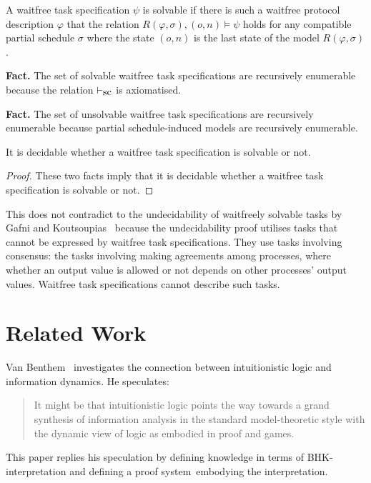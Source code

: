   \begin{definition}
   A waitfree task specification $\psi$ is solvable if there is such a
   waitfree protocol description $\varphi$ that the relation
   $R(\varphi,\sigma), (o,n)\models\psi$ holds for any compatible partial
   schedule $\sigma$ where the state $(o,n)$ is the last state of the
   model $R(\varphi,\sigma)$.
  \end{definition}

  \noindent \textbf{Fact.} The set of solvable waitfree task specifications are
  recursively enumerable because the relation $\vdash_{\mbox{\rm sc}}$ is axiomatised.

  \noindent \textbf{Fact.} The set of unsolvable waitfree task
  specifications are recursively enumerable because partial schedule-induced
  models are recursively enumerable.

  \begin{theorem}
   \label{wf-dec}
   It is decidable whether a waitfree task
   specification is solvable or not.
  \end{theorem}
  \begin{proof}
   These two facts imply that it is decidable whether a waitfree task
   specification is solvable or not.
  \end{proof}

  This does not contradict to the undecidability
  of waitfreely solvable tasks by Gafni and
  Koutsoupias~\cite{gafni1999three}
  because the undecidability proof
  utilises tasks that cannot be expressed by waitfree task specifications.
  They use tasks involving consensus:
  the tasks involving making agreements among processes, where
  whether an output value is allowed or not depends on other processes'
  output values.  Waitfree task specifications cannot describe such tasks.

 \section{Related Work}
 \label{first:related}

 Van Benthem~\cite{van2009information} investigates the connection between
 intuitionistic logic and information dynamics.  He speculates:
 \begin{quotation}
  It might be
  that intuitionistic logic points the way towards a grand synthesis of information analysis
  in the standard model-theoretic style with the dynamic view of logic as embodied
  in proof and games.
 \end{quotation}
 This paper replies his speculation by defining knowledge in terms of BHK-interpretation
 and defining a proof system \iec\,embodying the interpretation.

